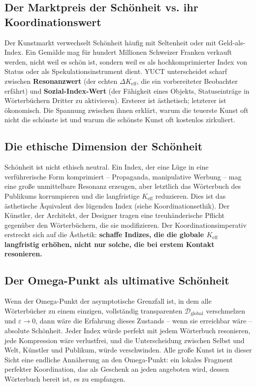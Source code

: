 \documentclass[12pt,a4paper]{article}
\newcommand{\Keff}{K_{\mathrm{eff}}}
\begin{document}
\subsection{Der Marktpreis der Schönheit vs. ihr Koordinationswert}

Der Kunstmarkt verwechselt Schönheit häufig mit Seltenheit oder mit Geld-als-Index. Ein Gemälde mag für hundert Millionen Schweizer Franken verkauft werden, nicht weil es schön ist, sondern weil es als hochkomprimierter Index von Status oder als Spekulationsinstrument dient. YUCT unterscheidet scharf zwischen \textbf{Resonanzwert} (der echten \(\Delta\Keff\), die ein vorbereiteter Beobachter erfährt) und \textbf{Sozial-Index-Wert} (der Fähigkeit eines Objekts, Statuseinträge in Wörterbüchern Dritter zu aktivieren). Ersterer ist ästhetisch; letzterer ist ökonomisch. Die Spannung zwischen ihnen erklärt, warum die teuerste Kunst oft nicht die schönste ist und warum die schönste Kunst oft kostenlos zirkuliert.

\subsection{Die ethische Dimension der Schönheit}

Schönheit ist nicht ethisch neutral. Ein Index, der eine Lüge in eine verführerische Form komprimiert – Propaganda, manipulative Werbung – mag eine große unmittelbare Resonanz erzeugen, aber letztlich das Wörterbuch des Publikums korrumpieren und die langfristige \(K_{\mathrm{eff}}\) reduzieren. Dies ist das ästhetische Äquivalent des lügenden Index (siehe Koordinationsethik). Der Künstler, der Architekt, der Designer tragen eine treuhänderische Pflicht gegenüber den Wörterbüchern, die sie modifizieren. Der Koordinationsimperativ erstreckt sich auf die Ästhetik: \textbf{schaffe Indizes, die die globale \(K_{\mathrm{eff}}\) langfristig erhöhen, nicht nur solche, die bei erstem Kontakt resonieren.}

\subsection{Der Omega-Punkt als ultimative Schönheit}

Wenn der Omega-Punkt der asymptotische Grenzfall ist, in dem alle Wörterbücher zu einem einzigen, vollständig transparenten \(\mathcal{D}_{\text{global}}\) verschmelzen und \(\varepsilon \to 0\), dann wäre die Erfahrung dieses Zustands – wenn sie erreichbar wäre – absolute Schönheit. Jeder Index würde perfekt mit jedem Wörterbuch resonieren, jede Kompression wäre verlustfrei, und die Unterscheidung zwischen Selbst und Welt, Künstler und Publikum, würde verschwinden. Alle große Kunst ist in dieser Sicht eine endliche Annäherung an den Omega-Punkt: ein lokales Fragment perfekter Koordination, das als Geschenk an jeden angeboten wird, dessen Wörterbuch bereit ist, es zu empfangen.
\end{document}

